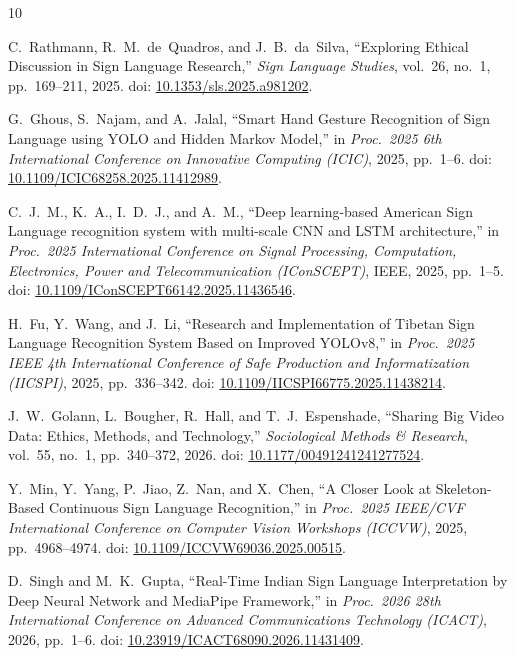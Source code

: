 \documentclass[conference]{IEEEtran}
\begin{document}
\begin{thebibliography}{10}

C.~Rathmann, R.~M.~de~Quadros, and J.~B.~da~Silva,
``Exploring Ethical Discussion in Sign Language Research,''
\textit{Sign Language Studies}, vol.~26, no.~1, pp.~169--211, 2025.
\newblock doi: \href{https://doi.org/10.1353/sls.2025.a981202}{10.1353/sls.2025.a981202}.

G.~Ghous, S.~Najam, and A.~Jalal,
``Smart Hand Gesture Recognition of Sign Language using YOLO and Hidden Markov Model,''
in \textit{Proc.\ 2025 6th International Conference on Innovative Computing (ICIC)},
2025, pp.~1--6.
\newblock doi: \href{https://doi.org/10.1109/ICIC68258.2025.11412989}{10.1109/ICIC68258.2025.11412989}.

C.~J.~M., K.~A., I.~D.~J., and A.~M.,
``Deep learning-based American Sign Language recognition system with multi-scale CNN and LSTM architecture,''
in \textit{Proc.\ 2025 International Conference on Signal Processing, Computation, Electronics, Power and Telecommunication (IConSCEPT)},
IEEE, 2025, pp.~1--5.
\newblock doi: \href{https://doi.org/10.1109/IConSCEPT66142.2025.11436546}{10.1109/IConSCEPT66142.2025.11436546}.

H.~Fu, Y.~Wang, and J.~Li,
``Research and Implementation of Tibetan Sign Language Recognition System Based on Improved YOLOv8,''
in \textit{Proc.\ 2025 IEEE 4th International Conference of Safe Production and Informatization (IICSPI)},
2025, pp.~336--342.
\newblock doi: \href{https://doi.org/10.1109/IICSPI66775.2025.11438214}{10.1109/IICSPI66775.2025.11438214}.

J.~W.~Golann, L.~Bougher, R.~Hall, and T.~J.~Espenshade,
``Sharing Big Video Data: Ethics, Methods, and Technology,''
\textit{Sociological Methods \& Research}, vol.~55, no.~1, pp.~340--372, 2026.
\newblock doi: \href{https://doi.org/10.1177/00491241241277524}{10.1177/00491241241277524}.

Y.~Min, Y.~Yang, P.~Jiao, Z.~Nan, and X.~Chen,
``A Closer Look at Skeleton-Based Continuous Sign Language Recognition,''
in \textit{Proc.\ 2025 IEEE/CVF International Conference on Computer Vision Workshops (ICCVW)},
2025, pp.~4968--4974.
\newblock doi: \href{https://doi.org/10.1109/ICCVW69036.2025.00515}{10.1109/ICCVW69036.2025.00515}.

D.~Singh and M.~K.~Gupta,
``Real-Time Indian Sign Language Interpretation by Deep Neural Network and MediaPipe Framework,''
in \textit{Proc.\ 2026 28th International Conference on Advanced Communications Technology (ICACT)},
2026, pp.~1--6.
\newblock doi: \href{https://doi.org/10.23919/ICACT68090.2026.11431409}{10.23919/ICACT68090.2026.11431409}.


\end{thebibliography}
\end{document}
